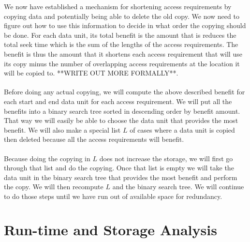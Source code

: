 \documentclass[conference]{acmsiggraph}
\begin{document}
We now have established a mechanism for shortening access requirements by copying data and potentially being able to delete the old copy. We now need to figure out how to use this information to decide in what order the copying should be done. For each data unit, its total benefit is the amount that is reduces the total seek time which is the sum of the lengths of the access requirements. The benefit is thus the amount that it shortens each access requirement that will use its copy minus the number of overlapping access requirements at the location it will be copied to. **WRITE OUT MORE FORMALLY**.\\
\\
Before doing any actual copying, we will compute the above described benefit for each start and end data unit for each access requirement. We will put all the benefits into a binary search tree sorted in descending order by benefit amount. That way we will easily be able to choose the data unit that provides the most benefit. We will also make a special list $L$ of cases where a data unit is copied then deleted because all the access requirements will benefit. \\
\\
Because doing the copying in $L$ does not increase the storage, we will first go through that list and do the copying. Once that list is empty we will take the data unit in the binary search tree that provides the most benefit and perform the copy. We will then recompute $L$ and the binary search tree. We will continue to do those steps until we have run out of available space for redundancy.  

\section{Run-time and Storage Analysis}
\end{document}
